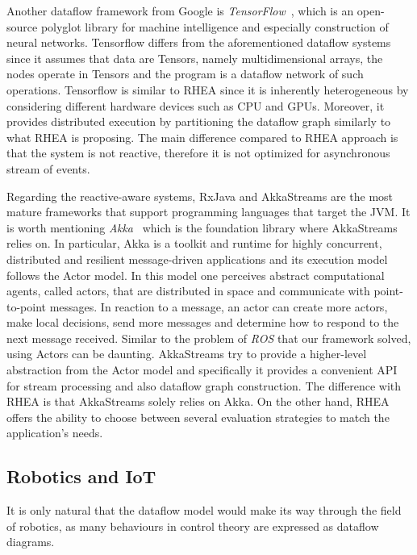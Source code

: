 \documentclass[sigplan,screen]{acmart}
\begin{document}
Another dataflow framework from Google is \textit{TensorFlow}~\cite{tensorflow},
which is an open-source polyglot library for machine intelligence and especially
construction of neural networks. Tensorflow differs from the aforementioned dataflow
systems since it assumes that data are Tensors, namely multidimensional arrays,
the nodes operate in Tensors and the program is a dataflow network of such operations.
Tensorflow is similar to \textsc{RHEA} since it is inherently heterogeneous by
considering different hardware devices such as CPU and GPUs. Moreover, it provides
distributed execution by partitioning the dataflow graph similarly to what \textsc{RHEA}
is proposing. The main difference compared to \textsc{RHEA} approach is that the
system is not reactive, therefore it is not optimized for asynchronous stream of
events.

Regarding the reactive-aware systems, RxJava and AkkaStreams are the most mature
frameworks that support programming languages that target the JVM. It is worth
mentioning \textit{Akka}~ which is the foundation library
where AkkaStreams relies on. In particular, Akka is a toolkit and runtime for highly
concurrent, distributed and resilient message-driven applications and its execution
model follows the Actor model. In this model one perceives abstract computational
agents, called actors, that are distributed in space and communicate with
point-to-point messages. In reaction to a message, an actor can create more actors,
make local decisions, send more messages and determine how to respond to the next
message received. Similar to the problem of \textit{ROS} that our framework solved,
using Actors can be daunting. AkkaStreams try to provide a higher-level abstraction
from the Actor model and specifically it provides a convenient API for stream
processing and also dataflow graph construction.
The difference with \textsc{RHEA} is that AkkaStreams solely relies on Akka. On the
other hand, \textsc{RHEA} offers the ability to choose between several
evaluation strategies to match the application's needs.

\subsection{Robotics and IoT}

It is only natural that the dataflow model would make its way through the field
of robotics, as many behaviours in control theory are expressed as dataflow
diagrams.
\end{document}
